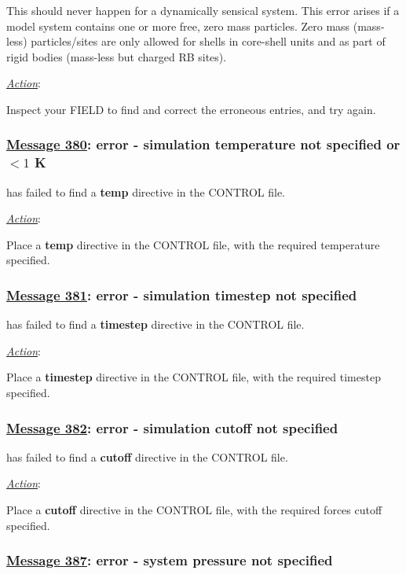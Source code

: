 This should never happen for a dynamically sensical system.  This
error arises if a model system contains one or more free, zero mass
particles.  Zero mass (mass-less) particles/sites are only allowed for
shells in core-shell units and as part of rigid bodies (mass-less but
charged RB sites).

\noindent \underline{\em Action}:

Inspect your FIELD to find and correct the erroneous entries,
and try again.

\subsubsection*{\underline{Message 380}: error - simulation temperature not specified or $< 1$ K}

\D has failed to find a {\bf temp} directive in the CONTROL file.

\noindent \underline{\em Action}:

Place a {\bf temp} directive in the CONTROL file, with the
required temperature specified.

\subsubsection*{\underline{Message 381}: error - simulation timestep not specified}

\D has failed to find a {\bf timestep} directive in the CONTROL
file.

\noindent \underline{\em Action}:

Place a {\bf timestep} directive in the CONTROL file, with the
required timestep specified.

\subsubsection*{\underline{Message 382}: error - simulation cutoff not specified}

\D has failed to find a {\bf cutoff} directive in the CONTROL
file.

\noindent \underline{\em Action}:

Place a {\bf cutoff} directive in the CONTROL file, with the
required forces cutoff specified.

\subsubsection*{\underline{Message 387}: error - system pressure not specified}


